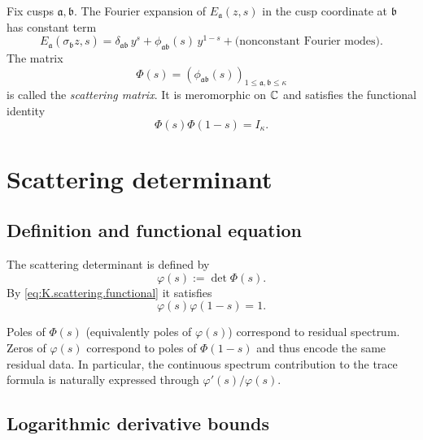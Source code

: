 Fix cusps $\mathfrak{a},\mathfrak{b}$.
The Fourier expansion of $E_{\mathfrak{a}}(z,s)$ in the cusp coordinate at $\mathfrak{b}$ has constant term
\begin{equation}\label{eq:K.constant.term}
E_{\mathfrak{a}}(\sigma_{\mathfrak{b}} z,s)
=
\delta_{\mathfrak{a}\mathfrak{b}}\,y^s
+
\phi_{\mathfrak{a}\mathfrak{b}}(s)\,y^{1-s}
+
\text{(nonconstant Fourier modes)}.
\end{equation}
The matrix
\[
\Phi(s)=(\phi_{\mathfrak{a}\mathfrak{b}}(s))_{1\le \mathfrak{a},\mathfrak{b}\le \kappa}
\]
is called the \emph{scattering matrix}.  It is meromorphic on $\mathbb{C}$ and satisfies the functional identity
\begin{equation}\label{eq:K.scattering.functional}
\Phi(s)\Phi(1-s)=I_\kappa.
\end{equation}

\section{Scattering determinant}
\label{sec:K.det}

\subsection{Definition and functional equation}
\label{subsec:K.det.def}

The scattering determinant is defined by
\begin{equation}\label{eq:K.det.def}
\varphi(s):=\det \Phi(s).
\end{equation}
By \eqref{eq:K.scattering.functional} it satisfies
\begin{equation}\label{eq:K.det.functional}
\varphi(s)\varphi(1-s)=1.
\end{equation}

\begin{remark}
\label{rem:K.det.spectral}
Poles of $\Phi(s)$ (equivalently poles of $\varphi(s)$) correspond to residual spectrum.
Zeros of $\varphi(s)$ correspond to poles of $\Phi(1-s)$ and thus encode the same residual data.
In particular, the continuous spectrum contribution to the trace formula is naturally expressed through
$\varphi'(s)/\varphi(s)$.
\end{remark}

\subsection{Logarithmic derivative bounds}
\label{subsec:K.logder.bounds}

